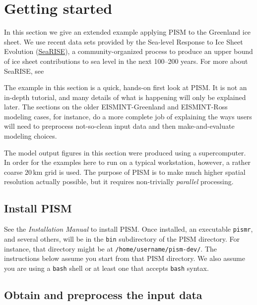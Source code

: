 
\section{Getting started}\label{sect:start}

In this section we give an extended example applying PISM to the Greenland ice sheet.  We use recent data sets provided by the Sea-level Response to Ice Sheet Evolution (\href{http://websrv.cs.umt.edu/isis/index.php/SeaRISE_Assessment}{SeaRISE}), a community-organized process to produce an upper bound of ice sheet contributions to sea level in the next 100--200 years.  For more about SeaRISE, see
\medskip

\centerline{}
\medskip

The example in this section is a quick, hands-on first look at PISM.  It is not an in-depth tutorial, and many details of what is happening will only be explained later.  The sections on the older EISMINT-Greenland and EISMINT-Ross modeling cases, for instance, do a more complete job of explaining the ways users will need to preprocess not-so-clean input data and then make-and-evaluate modeling choices.

The model output figures in this section were produced using a supercomputer.  In order for the examples here to run on a typical workstation, however, a rather coarse $20\,\textrm{km}$ grid is used.  The purpose of PISM is to make much higher spatial resolution actually possible, but it requires non-trivially \emph{parallel} processing.


\subsection{Install PISM}

See the \emph{Installation Manual} to install PISM.  Once installed, an executable \verb|pismr|, and several others, will be in the \verb|bin| subdirectory of the PISM directory.  For instance, that directory might be at \verb|/home/username/pism-dev/|.  The instructions below assume you start from that PISM directory.  We also assume you are using a \verb|bash| shell or at least one that accepts \verb|bash| syntax.


\subsection{Obtain and preprocess the input data}

